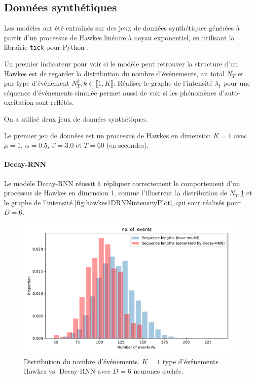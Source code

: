 \documentclass[../main.tex]{subfiles}
\begin{document}
\subsection{Données synthétiques}\label{ssec:synthResults}

Les modèles ont été entraînés sur des jeux de données synthétiques générées à partir d'un processus de Hawkes linéaire à noyau exponentiel, en utilisant la librairie \verb|tick| pour Python \cite{2017arXiv170703003B}.

Un premier indicateur pour voir si le modèle peut retrouver la structure d'un Hawkes est de regarder la distribution du nombre d'événements, au total $N_T$ et par type d'événement $N^k_T, k\in\llbracket 1,K\rrbracket$. Réaliser le graphe de l'intensité $\lambda_t$ pour une séquence d'événements simulée permet aussi de voir si les phénomènes d'auto-excitation sont reflétés.

On a utilisé deux jeux de données synthétiques.

Le premier jeu de données est un processus de Hawkes en dimension $K=1$ avec $\mu=1$, $\alpha = \num{0.5}$, $\beta = \num{3.0}$ et $T = 60$ (en secondes).

\paragraph{Decay-RNN}
Le modèle Decay-RNN réussit à répliquer correctement le comportement d'un processus de Hawkes en dimension 1, comme l'illustrent la distribution de $N_T$ \cref{fig:hawkes1DDecayRNNlengthDistrib} et le graphe de l'intensité \cref{fig:hawkes1DRNNintensityPlot}, qui sont réalisés pour $D=6$.\footnotemark


\begin{figure}[htp]
	\includegraphics[width=\linewidth]{../results/seq_length_distrib_Decay-RNN-1d-hidden_6-20181201-220235.pdf}
	\caption{Distribution du nombre d'événements. $K=1$ type d'événements. Hawkes vs. Decay-RNN avec $D=6$ neurones cachés.}\label{fig:hawkes1DDecayRNNlengthDistrib}
\end{figure}
\end{document}
